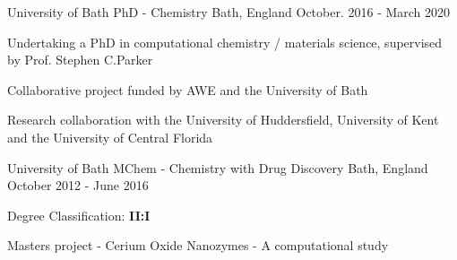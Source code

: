 \begin{cventries}
  \cventry
    {University of Bath}
    {PhD - Chemistry}
    {Bath, England}
    {October. 2016 - March 2020}
    {
      \begin{cvitems}
        \item {Undertaking a PhD in computational chemistry / materials science, supervised by Prof. Stephen C.Parker}
        \item {Collaborative project funded by AWE and the University of Bath}
        \item{Research collaboration with the University of Huddersfield, University of Kent and the University of Central Florida}
      \end{cvitems}
    }
\end{cventries}

\begin{cventries}
  \cventry
    {University of Bath}
    {MChem - Chemistry with Drug Discovery}
    {Bath, England}
    {October 2012 - June 2016}
    {
      \begin{cvitems}
        \item {Degree Classification: \textbf{II:I}}
        \item {Masters project - Cerium Oxide Nanozymes - A computational study}
      \end{cvitems}
    }
\end{cventries}
